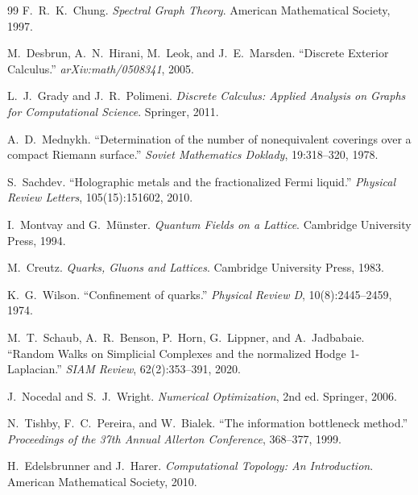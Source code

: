 \documentclass[12pt,a4paper]{article}
\theoremstyle{definition}
\theoremstyle{remark}
\theoremstyle{definition}
\begin{document}
\begin{thebibliography}{99}
F.~R.~K.~Chung.
\emph{Spectral Graph Theory}.
American Mathematical Society, 1997.

M.~Desbrun, A.~N.~Hirani, M.~Leok, and J.~E.~Marsden.
``Discrete Exterior Calculus.''
\emph{arXiv:math/0508341}, 2005.

L.~J.~Grady and J.~R.~Polimeni.
\emph{Discrete Calculus: Applied Analysis on Graphs for Computational Science}.
Springer, 2011.

A.~D.~Mednykh.
``Determination of the number of nonequivalent coverings over a compact Riemann surface.''
\emph{Soviet Mathematics Doklady}, 19:318--320, 1978.

S.~Sachdev.
``Holographic metals and the fractionalized Fermi liquid.''
\emph{Physical Review Letters}, 105(15):151602, 2010.

I.~Montvay and G.~M\"unster.
\emph{Quantum Fields on a Lattice}.
Cambridge University Press, 1994.

M.~Creutz.
\emph{Quarks, Gluons and Lattices}.
Cambridge University Press, 1983.

K.~G.~Wilson.
``Confinement of quarks.''
\emph{Physical Review D}, 10(8):2445--2459, 1974.

M.~T.~Schaub, A.~R.~Benson, P.~Horn, G.~Lippner, and A.~Jadbabaie.
``Random Walks on Simplicial Complexes and the normalized Hodge 1-Laplacian.''
\emph{SIAM Review}, 62(2):353--391, 2020.

J.~Nocedal and S.~J.~Wright.
\emph{Numerical Optimization}, 2nd ed.
Springer, 2006.

N.~Tishby, F.~C.~Pereira, and W.~Bialek.
``The information bottleneck method.''
\emph{Proceedings of the 37th Annual Allerton Conference}, 368--377, 1999.

H.~Edelsbrunner and J.~Harer.
\emph{Computational Topology: An Introduction}.
American Mathematical Society, 2010.

\end{thebibliography}
\end{document}
